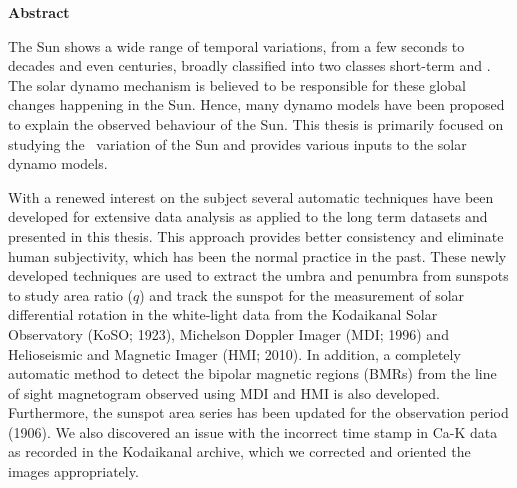 {\huge \textbf{Abstract}}


The Sun shows a wide range of temporal variations, from a few seconds to decades and even centuries, broadly classified into two classes short\hyp term and \lt. The solar dynamo mechanism is believed to be responsible for these global changes happening in the Sun. Hence, many dynamo models have been proposed to explain the observed behaviour of the Sun. This thesis is primarily focused on studying the \lt\ variation of the Sun and provides  various inputs to the solar dynamo models.

With a renewed interest on the subject several automatic techniques have been developed for extensive data analysis as applied to the long term datasets and presented in this thesis.  This approach provides better consistency and  eliminate human subjectivity, which has been the normal practice in the past. These newly developed techniques are used to extract the umbra and penumbra from sunspots to study area ratio ($q$) and track the sunspot for the measurement of solar differential rotation in the white-light data from the Kodaikanal Solar Observatory (KoSO; 1923), Michelson Doppler Imager (MDI; 1996) and Helioseismic and Magnetic Imager (HMI; 2010). In addition, a completely automatic method to detect the bipolar magnetic regions (BMRs) from the line of sight magnetogram observed using MDI and HMI is also developed. Furthermore, the sunspot area series has been updated for the observation period (1906). We also discovered an issue with the incorrect time stamp in Ca-K data as recorded in the Kodaikanal archive, which we corrected  and oriented the images appropriately.

